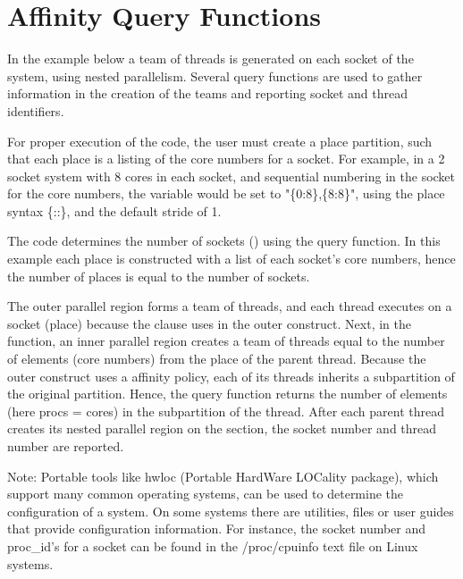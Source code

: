 \section{Affinity Query Functions}
\label{sec: affinity_query}

In the example below a team of threads is generated on each socket of
the system, using nested parallelism. Several query functions are used
to gather information in the creation of the teams and reporting socket
and thread identifiers.

For proper execution of the code, the user must create a place partition, such that
each place is a listing of the core numbers for a socket. For example,
in a 2 socket system with 8 cores in each socket, and sequential numbering
in the socket for the core numbers, the  variable would be set
to "\{0:8\},\{8:8\}", using the place syntax \{::\},
and the default stride of 1.

The code determines the number of sockets ()
using the  query function.
In this example each place is constructed with a list of 
each socket's core numbers, hence the number of places is equal
to the number of sockets. 

The outer parallel region forms a team of threads, and each thread 
executes on a socket (place) because the  clause uses 
 in the outer  construct.
Next, in the  function, an inner parallel region creates a team 
of threads equal to the number of elements (core numbers) from the place
of the parent thread. Because the outer  construct uses 
a  affinity policy, each of its threads inherits a subpartition of 
the original partition.  Hence, the  query function
returns the number of elements (here procs = cores) in the subpartition of the thread.  
After each parent thread creates its nested parallel region on the section,
the socket number and thread number are reported.

Note: Portable tools like hwloc (Portable HardWare LOCality package), which support
many common operating systems, can be used to determine the configuration of a system.  
On some systems there are utilities, files or user guides that provide configuration
information.  For instance, the socket number and proc\_id's for a socket 
can be found in the /proc/cpuinfo text file on Linux systems.



